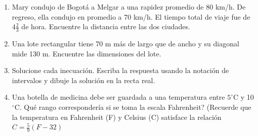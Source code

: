 \documentclass[10pt,twoside]{article}
\begin{document}
\begin{enumerate}
\item Mary condujo de Bogotá a Melgar a una rapidez promedio de 80 km/h. De regreso, ella condujo en promedio a 70 km/h. El tiempo total de viaje fue de $4\frac{2}{3}$ de hora. Encuentre la distancia entre las dos ciudades.
\item Una lote rectangular tiene 70 m más de largo que de ancho y su diagonal mide 130 m. Encuentre las dimensiones del lote.
\item Solucione cada inecuación. Escriba la respuesta usando la notación de intervalos y dibuje la solución en la recta real.
\begin{enumerate}
\end{enumerate}
\item Una botella de medicina debe ser guardada a una temperatura entre $5^{\circ}$C y 10$^{\circ}$C. Qué rango correspondería si se toma la escala Fahrenheit? (Recuerde que la temperatura en Fahrenheit (F) y Celsius (C) satisface la relación $C=\frac{5}{9}(F-32)$

\end{enumerate}
\end{document}
